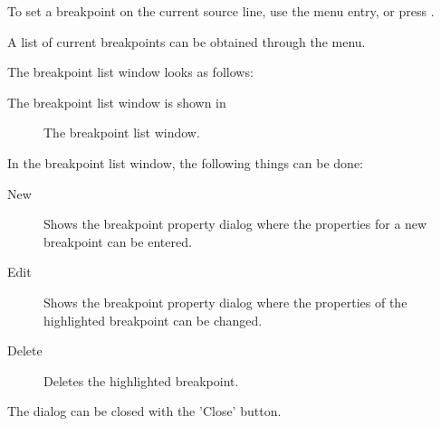 To set a breakpoint on the current source line, use the 
 menu entry, or press .

A list of current breakpoints can be obtained through the
 menu. 
\begin{htmlonly}
The breakpoint list window looks as follows:
\end{htmlonly}
\begin{latexonly}
The breakpoint list window is shown in 
\begin{figure}[ht]
\caption{The breakpoint list window.}\label{fig:brklist}
\ifpdf
{}
\else
{}
\fi
\end{figure}
\end{latexonly}
In the breakpoint list window, the following things can be done:
\begin{description}
\item[New] Shows the breakpoint property dialog where the properties
for a new breakpoint can be entered. 
\item[Edit] Shows the breakpoint property dialog where the properties of
the highlighted breakpoint can be changed. 
\item[Delete] Deletes the highlighted breakpoint.
\end{description}
The dialog can be closed with the 'Close' button.

